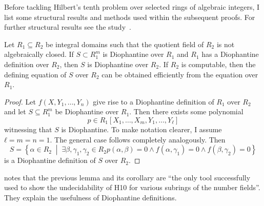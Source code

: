 %

Before tackling Hilbert's tenth problem over selected rings of algebraic
integers, I list some structural results and methods used within the subsequent
proofs. For further structural results see the study~\cite{Shlapentokh2000}.

\begin{lem}\label{lem:moving up}
Let \(R_1 \subseteq R_2\) be integral domains such that the quotient field of
\(R_2\) is not algebraically closed. If \(S ⊂ R_1^m\) is Diophantine over
\(R_1\) and \(R_1\) has a Diophantine definition over \(R_2\), then \(S\) is
Diophantine over \(R_2\). If \(R_2\) is computable, then the defining equation
of \(S\) over \(R_2\) can be obtained efficiently from the equation over
\(R_1\).
\end{lem}
\begin{proof}
  Let \(f(X, Y_1, …, Y_n)\) give rise to a Diophantine definition of \(R_1\)
  over \(R_2\) and let \(S \subseteq R_1^m\) be Diophantine over \(R_1\). Then
  there exists some polynomial
  \[
    p ∈ R_1[X_1, …, X_m, Y_1, …, Y_ℓ]
  \]
  witnessing that \(S\) is Diophantine. To make notation clearer, I assume \(ℓ =
  m = n = 1\). The general case follows completely analogously. Then
  \[
    S = \left\lbrace  α ∈ R_2 \;\middle|\;
    ∃β, γ_1, γ_2 ∈ R_2 p(α, β) = 0 ∧ f(α, γ_1) = 0 ∧ f(β, γ_2) = 0\right\rbrace
  \]
  is a Diophantine definition of \(S\) over \(R_2\).
\end{proof}

\textcite{Shlapentokh2000} notes that the previous lemma and its corollary are
\enquote{the only tool successfully used to show the undecidability
of \textsc{H10} for various subrings of the number fields}. They explain the
usefulness of Diophantine definitions.

